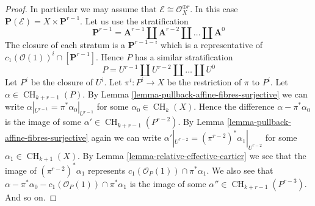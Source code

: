 \documentclass[10pt,a4paper]{amsart}
\theoremstyle{plain}
\theoremstyle{definition}
\theoremstyle{remark}
\numberwithin{equation}{subsection}
\def\CH{\mathop{\mathrm{CH}}\nolimits}
\begin{document}
\begin{proof}
\medskip\noindent
In particular we may assume that $\mathcal{E} \cong \mathcal{O}_X^{\oplus r}$.
In this case $\mathbf{P}(\mathcal{E}) = X \times \mathbf{P}^{r - 1}$.
Let us use the stratification
$$
\mathbf{P}^{r - 1} = \mathbf{A}^{r - 1}
\amalg \mathbf{A}^{r - 2}
\amalg \ldots
\amalg \mathbf{A}^0
$$
The closure of each stratum is a $\mathbf{P}^{r - 1 - i}$ which is a
representative of $c_1(\mathcal{O}(1))^i \cap [\mathbf{P}^{r - 1}]$.
Hence $P$ has a similar stratification
$$
P = U^{r - 1} \amalg U^{r - 2} \amalg \ldots \amalg U^0
$$
Let $P^i$ be the closure of $U^i$. Let $\pi^i : P^i \to X$
be the restriction of $\pi$ to $P^i$.
Let $\alpha \in \CH_{k + r - 1}(P)$. By
Lemma \ref{lemma-pullback-affine-fibres-surjective}
we can write $\alpha|_{U^{r - 1}} = \pi^*\alpha_0|_{U^{r - 1}}$
for some $\alpha_0 \in \CH_k(X)$. Hence the difference
$\alpha - \pi^*\alpha_0$ is the image of some
$\alpha' \in \CH_{k + r - 1}(P^{r - 2})$.
By Lemma \ref{lemma-pullback-affine-fibres-surjective}
again we can write
$\alpha'|_{U^{r - 2}} = (\pi^{r - 2})^*\alpha_1|_{U^{r - 2}}$
for some $\alpha_1 \in \CH_{k + 1}(X)$.
By Lemma \ref{lemma-relative-effective-cartier}
we see that the image of $(\pi^{r - 2})^*\alpha_1$
represents $c_1(\mathcal{O}_P(1)) \cap \pi^*\alpha_1$.
We also see that
$\alpha - \pi^*\alpha_0 - c_1(\mathcal{O}_P(1)) \cap \pi^*\alpha_1$
is the image of some $\alpha'' \in \CH_{k + r - 1}(P^{r - 3})$.
And so on.
\end{proof}
\end{document}
